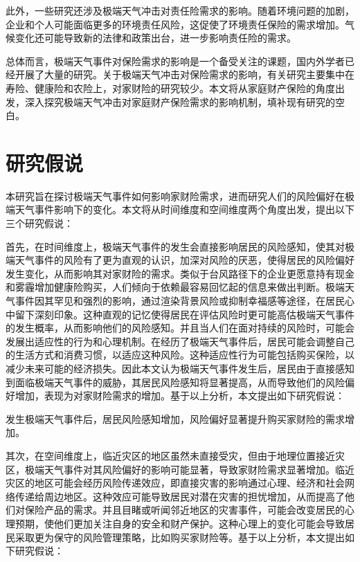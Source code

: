 此外，一些研究还涉及极端天气冲击对责任险需求的影响。随着环境问题的加剧，企业和个人可能面临更多的环境责任风险，这促使了环境责任保险的需求增加\citep{ZJTG201030055,刘娟2016环境责任保险需求不足的成因及对策分析,}。气候变化还可能导致新的法律和政策出台，进一步影响责任险的需求\citep{2009160355.nh,BXYJ200406005}。

总体而言，极端天气事件对保险需求的影响是一个备受关注的课题，国内外学者已经开展了大量的研究。关于极端天气冲击对保险需求的影响，有关研究主要集中在寿险\citep{avdeenko2021impact}、健康险\citep{2018Something}和农险\citep{胡新艳2021气候变化}上，对家财险的研究较少。本文将从家庭财产保险的角度出发，深入探究极端天气冲击对家庭财产保险需求的影响机制，填补现有研究的空白。

\section{研究假说}

本研究旨在探讨极端天气事件如何影响家财险需求，进而研究人们的风险偏好在极端天气事件影响下的变化。本文将从时间维度和空间维度两个角度出发，提出以下三个研究假说：

首先，在时间维度上，极端天气事件的发生会直接影响居民的风险感知，使其对极端天气事件的风险有了更为直观的认识，加深对风险的厌恶\citep{gollier1996risk}，使得居民的风险偏好发生变化，从而影响其对家财险的需求。类似于台风路径下的企业更愿意持有现金\citep{0Do}和雾霾增加健康险购买\citep{赵强2021空气污染对商业健康保险需求的影响}，人们倾向于依赖最容易回忆起的信息来做出判断\citep{tversky1973availability}。极端天气事件因其罕见和强烈的影响，通过渲染背景风险\citep{cameron2015risk}或抑制幸福感\citep{avdeenko2021impact}等途径，在居民心中留下深刻印象。这种直观的记忆使得居民在评估风险时更可能高估极端天气事件的发生概率，从而影响他们的风险感知。并且当人们在面对持续的风险时，可能会发展出适应性的行为和心理机制\citep{gigerenzer2011heuristic}。在经历了极端天气事件后，居民可能会调整自己的生活方式和消费习惯，以适应这种风险\citep{BXYJ201312009}。这种适应性行为可能包括购买保险，以减少未来可能的经济损失。因此本文认为极端天气事件发生后，居民由于直接感知到面临极端天气事件的威胁，其居民风险感知将显著提高，从而导致他们的风险偏好增加，表现为对家财险需求的增加。基于以上分析，本文提出如下研究假说：

\begin{hyp}
    \label{hyp:1}
    发生极端天气事件后，居民风险感知增加，风险偏好显著提升购买家财险的需求增加。
\end{hyp}

其次，在空间维度上，临近灾区的地区虽然未直接受灾，但由于地理位置接近灾区，极端天气事件对其风险偏好的影响可能显著\citep{0Do}，导致家财险需求显著增加。临近灾区的地区可能会经历风险传递效应\citep{ZGRK202210006}，即直接灾害的影响通过心理、经济和社会网络传递给周边地区。这种效应可能导致居民对潜在灾害的担忧增加，从而提高了他们对保险产品的需求。并且目睹或听闻邻近地区的灾害事件，可能会改变居民的心理预期，使他们更加关注自身的安全和财产保护\citep{yasuda2019changes}。这种心理上的变化可能会导致居民采取更为保守的风险管理策略，比如购买家财险等。基于以上分析，本文提出如下研究假说：

